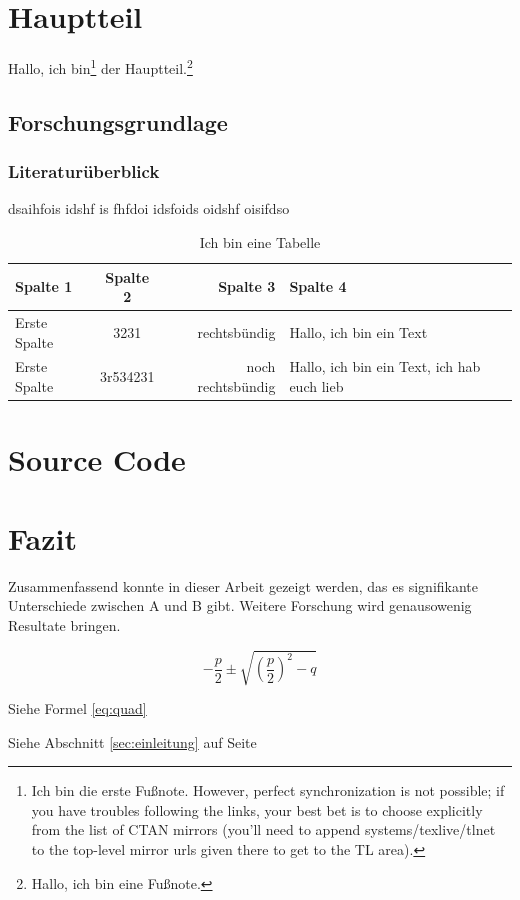 \documentclass[ngerman]{scrreprt}
\begin{document}
\section{Hauptteil}

Hallo, ich bin\footnote{Ich bin die erste Fußnote. However, perfect synchronization is not possible; if you have troubles following the links, your best bet is to choose explicitly from the list of CTAN mirrors (you'll need to append systems/texlive/tlnet to the top-level mirror urls given there to get to the TL area).} der Hauptteil.\footnote{Hallo, ich bin eine Fußnote.}

\subsection{Forschungsgrundlage}

\subsubsection{Literaturüberblick}

dsaihfois idshf is fhfdoi idsfoids oidshf oisifdso

\begin{table}
\caption{Ich bin eine Tabelle}
\begin{tabular}{lcrp{5cm}}
\bfseries Spalte 1 &\bfseries  Spalte 2 &\bfseries  Spalte 3 &\bfseries  Spalte 4 \\ \hline
Erste Spalte & 3231 & rechtsbündig & Hallo, ich bin ein Text \\ \hline
Erste Spalte & 3r534231 & noch rechtsbündig & Hallo, ich bin ein Text, ich hab euch lieb \\ \hline
\end{tabular}
\end{table}

\section{Source Code}




\section{Fazit}

Zusammenfassend konnte in dieser Arbeit gezeigt werden, das es signifikante Unterschiede zwischen A und B gibt. Weitere Forschung wird genausowenig Resultate bringen.

\begin{equation}\label{eq:quad}
-\frac{p}{2} \pm \sqrt{ \left(\frac{p}{2}\right)^2  -q }
\end{equation}

Siehe Formel \ref{eq:quad}


Siehe Abschnitt \ref{sec:einleitung} auf Seite \pageref{sec:einleitung}


\end{document}
